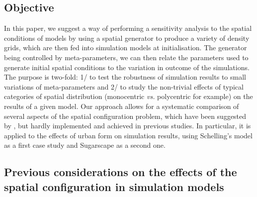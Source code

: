 \documentclass[3p,times,procedia]{elsarticle}
\begin{document}
\subsection{Objective}

In this paper, we suggest a way of performing a sensitivity analysis to the spatial conditions of models by using a spatial generator to produce a variety of density grids, which are then fed into simulation models at initialisation. The generator being controlled by meta-parameters, we can then relate the parameters used to generate initial spatial conditions to the variation in outcome of the simulations. The purpose is two-fold: 1/ to test the robustness of simulation results to small variations of meta-parameters and 2/ to study the non-trivial effects of typical categories of spatial distribution (monocentric \textit{vs.} polycentric for example) on the results of a given model. Our approach allows for a systematic comparison of several aspects of the spatial configuration problem, which have been suggested by \citet{filatova2013spatial}, but hardly implemented and achieved in previous studies. In particular, it is applied to the effects of urban form on simulation results, using Schelling's model as a first case study and Sugarscape as a second one. 

\subsection{Previous considerations on the effects of the spatial configuration in simulation models}


\end{document}
